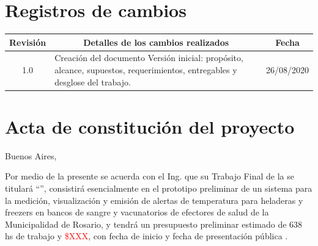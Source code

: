 \documentclass[11pt]{charter}
\begin{document}
\maketitle
\thispagestyle{empty}
\pagebreak


\thispagestyle{empty}
{\setlength{\parskip}{0pt}
\tableofcontents{}
}
\pagebreak


\section{Registros de cambios}
\label{sec:registro}


\begin{table}[ht]
\label{tab:registro}
\centering
\begin{tabularx}{\linewidth}{@{}|c|X|c|@{}}
\hline
\rowcolor[HTML]{C0C0C0} 
Revisión & \multicolumn{1}{c|}{\cellcolor[HTML]{C0C0C0}Detalles de los cambios realizados} & Fecha      \\ \hline
1.0      & Creación del documento \newline Versión inicial: propósito, alcance, supuestos, requerimientos, entregables y desglose del trabajo.
                                         & 26/08/2020 \\ \hline
\end{tabularx}
\end{table}

\pagebreak



\section{Acta de constitución del proyecto}
\label{sec:acta}

\begin{flushright}
Buenos Aires, \fechaInicioName
\end{flushright}

\vspace{2cm}

Por medio de la presente se acuerda con el Ing. \authorname\hspace{1px} que su Trabajo Final de la \degreename\hspace{1px} se titulará ``\ttitle'', consistirá esencialmente en el prototipo preliminar de un sistema para la medición, visualización y emisión de alertas de temperatura para heladeras y freezers en bancos de sangre y vacunatorios de efectores de salud de la Municipalidad de Rosario, y tendrá un presupuesto preliminar estimado de 638 hs de trabajo y \textcolor{red}{\$XXX}, con fecha de inicio \fechaInicioName\hspace{1px} y fecha de presentación pública \fechaFinalName.
\end{document}
